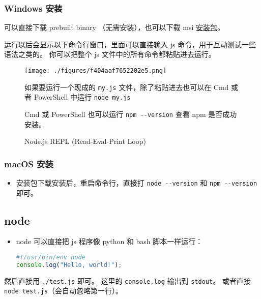 \subsubsection{Windows 安装}
\begin{itemize}
\item 可以直接下载 prebuilt binary （无需安装），也可以下载 msi \href{https://nodejs.org/en/download/prebuilt-installer}{安装包}。
\item 运行以后会显示以下命令行窗口，里面可以直接输入 js 命令，用于互动测试一些语法之类的。 你可以把整个 js 文件中的所有命令都粘贴进去运行。
\begin{figure}[ht]
\centering
\texttt{[image: ./figures/f404aaf7652202e5.png]}
\caption{Node.js REPL (Read-Eval-Print Loop)} \label{fig_NodeJS_1}
\item 如果要运行一个现成的 \verb`my.js` 文件，除了粘贴进去也可以在 Cmd 或者 PowerShell 中运行 \verb`node my.js`
\item Cmd 或 PowerShell 也可以运行 \verb`npm --version` 查看 npm 是否成功安装。
\end{figure}
\end{itemize}

\subsubsection{macOS 安装}
\begin{itemize}
\item 安装包下载安装后，重启命令行，直接打 \verb`node --version` 和 \verb`npm --version` 即可。
\end{itemize}

\subsection{node}
\begin{itemize}
\item node 可以直接把 js 程序像 python 和 bash 脚本一样运行：
\begin{lstlisting}[language=js,caption=test.js]
#!/usr/bin/env node
console.log("Hello, world!");
\end{lstlisting}
\end{itemize}
然后直接用 \verb`./test.js` 即可。 这里的 \verb`console.log` 输出到 \verb`stdout`。 或者直接 \verb`node test.js`（会自动忽略第一行）。

